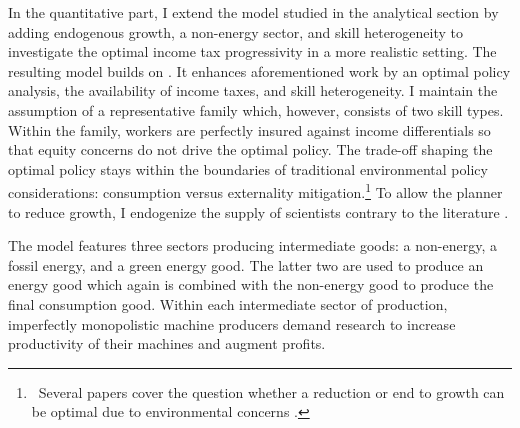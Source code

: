 
 In the quantitative part, I extend the model studied in the analytical section by adding endogenous growth, a non-energy sector, and skill heterogeneity to investigate the optimal income tax progressivity in a more realistic setting. The resulting model builds on \cite{Fried2018ClimateAnalysis}. It enhances aforementioned work by an optimal policy analysis, the availability of income taxes, and skill heterogeneity. 
I maintain the assumption of a representative family which, however, consists of two skill types. Within the family, workers are perfectly insured against income differentials so that equity concerns do not drive the optimal policy. The trade-off shaping the optimal policy stays within the boundaries of traditional environmental policy considerations: consumption versus externality mitigation.\footnote{\ Several papers cover the question whether a reduction or end to growth can be optimal due to environmental concerns \citep[for example,][]{Stokey1998AreGrowth, Acemoglu2012TheChange, Jones2016LifeGrowth}.}
To allow the planner to reduce growth, I endogenize the supply of scientists contrary to the literature \citep{Acemoglu2012TheChange, Fried2018ClimateAnalysis}. %

The model features three sectors producing intermediate goods:  a non-energy, a fossil energy, and a green energy good. The latter two are used to produce an energy good which again is combined with the non-energy good to produce the final consumption good.
Within each intermediate sector of production, imperfectly monopolistic machine producers demand research to increase productivity of their machines and augment profits. 

